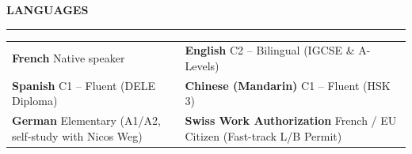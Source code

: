 \documentclass[10pt,a4paper]{article}
\newcommand{\cvSection}[1]{%
  \vspace{6.5pt}%
  {\fontsize{10.5}{12}\selectfont \textbf{#1}}\par\vspace{1.5pt}%
  \rule{\textwidth}{0.75pt}\par\vspace{4.5pt}%
}
\begin{document}
\cvSection{LANGUAGES}
\begin{tabularx}{\textwidth}{@{}X X@{}}
  \textbf{French} \newline
  {\fontsize{8.5}{10.5}\selectfont Native speaker} &
  \textbf{English} \newline
  {\fontsize{8.5}{10.5}\selectfont C2 -- Bilingual (IGCSE \& A-Levels)} \\[4.5pt]
  
  \textbf{Spanish} \newline
  {\fontsize{8.5}{10.5}\selectfont C1 -- Fluent (DELE Diploma)} &
  \textbf{Chinese (Mandarin)} \newline
  {\fontsize{8.5}{10.5}\selectfont C1 -- Fluent (HSK 3)} \\[4.5pt]
  
  \textbf{German} \newline
  {\fontsize{8.5}{10.5}\selectfont Elementary (A1/A2, self-study with Nicos Weg)} &
  \textbf{Swiss Work Authorization} \newline
  {\fontsize{8.5}{10.5}\selectfont French / EU Citizen (Fast-track L/B Permit)}
\end{tabularx}
\end{document}
